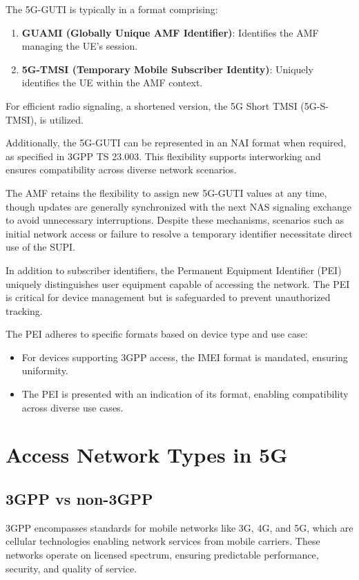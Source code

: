 
The 5G-GUTI is typically in a format comprising:

\begin{enumerate}
    \item {
        \textbf{GUAMI (Globally Unique AMF Identifier)}: Identifies the \ac{AMF} managing the UE's session.
    }
    \item {
        \textbf{5G-TMSI (Temporary Mobile Subscriber Identity)}: Uniquely identifies the UE within the \ac{AMF} context.
    }
\end{enumerate}

For efficient radio signaling, a shortened version, the 5G Short TMSI (5G-S-TMSI), is utilized.

Additionally, the 5G-GUTI can be represented in an NAI format when required, as specified in \ac{3GPP} TS 23.003. This flexibility supports interworking and ensures compatibility across diverse network scenarios.

The \ac{AMF} retains the flexibility to assign new 5G-GUTI values at any time, though updates are generally synchronized with the next \ac{NAS} signaling exchange to avoid unnecessary interruptions. Despite these mechanisms, scenarios such as initial network access or failure to resolve a temporary identifier necessitate direct use of the SUPI.

In addition to subscriber identifiers, the Permanent Equipment Identifier (PEI) uniquely distinguishes user equipment capable of accessing the network. The PEI is critical for device management but is safeguarded to prevent unauthorized tracking.

The PEI adheres to specific formats based on device type and use case:
\begin{itemize}
    \item {
        For devices supporting 3GPP access, the IMEI format is mandated, ensuring uniformity.
    }
    \item {
        The PEI is presented with an indication of its format, enabling compatibility across diverse use cases.
    }
\end{itemize}

\section{Access Network Types in 5G}

\subsection{3GPP vs non-3GPP} %
\ac{3GPP} encompasses standards for mobile networks like \ac{3G}, \ac{4G}, and \ac{5G}, which are cellular technologies enabling network services from mobile carriers. These networks operate on licensed spectrum, ensuring predictable performance, security, and quality of service.


